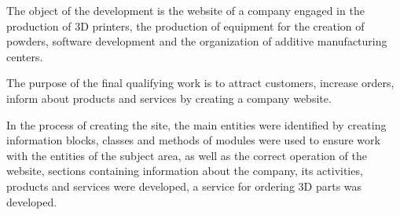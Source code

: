 The object of the development is the website of a company engaged in the production of 3D printers, the production of equipment for the creation of powders, software development and the organization of additive manufacturing centers.

The purpose of the final qualifying work is to attract customers, increase orders, inform about products and services by creating a company website.

In the process of creating the site, the main entities were identified by creating information blocks, classes and methods of modules were used to ensure work with the entities of the subject area, as well as the correct operation of the website, sections containing information about the company, its activities, products and services were developed, a service for ordering 3D parts was developed.

